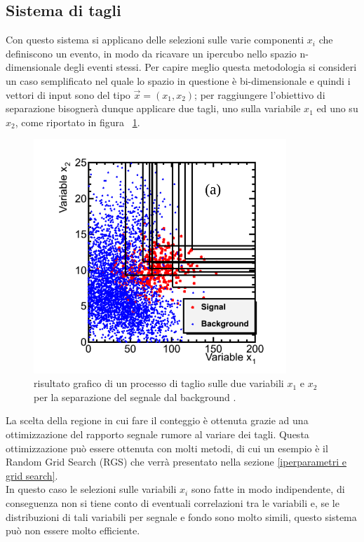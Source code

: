 \newpage


\subsection{Sistema di tagli}
\label{sistema di tagli}
Con questo sistema si applicano delle selezioni sulle varie componenti $x_i$ che definiscono un evento, in modo da ricavare un ipercubo nello spazio n-dimensionale degli eventi stessi. Per capire meglio questa metodologia si consideri un caso semplificato nel quale lo spazio in questione è bi-dimensionale e quindi i vettori di input sono del tipo $\vec{x} = (x_1,x_2)$; per raggiungere l'obiettivo di separazione bisognerà dunque applicare due tagli, uno sulla variabile $x_1$ ed uno su $x_2$, come riportato in figura ~\ref{fig:grid_example}.

\begin{figure}[h!]
	\centering
	\includegraphics[width=0.85\textwidth]{figs/Grid_example.png}
	\caption{risultato grafico di un processo di taglio sulle due variabili $x_1$ e $x_2$ per la separazione del segnale dal background \cite{Metodi_multivariati}.}
	\label{fig:grid_example}
\end{figure}

La scelta della regione in cui fare il conteggio è ottenuta grazie ad una ottimizzazione del rapporto segnale rumore al variare dei tagli. Questa ottimizzazione può essere ottenuta con molti metodi, di cui un esempio è il Random Grid Search (RGS) che verrà presentato nella sezione \ref{iperparametri e grid search}. \\
In questo caso le selezioni sulle variabili $x_i$ sono fatte in modo indipendente, di conseguenza non si tiene conto di eventuali correlazioni tra le variabili e, se le distribuzioni di tali variabili per segnale e fondo sono molto simili, questo sistema può non essere molto efficiente.

